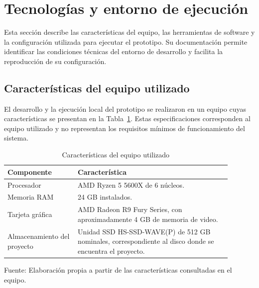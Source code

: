\section{Tecnologías y entorno de ejecución}


Esta sección describe las características del equipo,
las herramientas de software y la configuración utilizada
para ejecutar el prototipo. Su documentación permite
identificar las condiciones técnicas del entorno de
desarrollo y facilita la reproducción de su configuración.

\subsection{Características del equipo utilizado}


El desarrollo y la ejecución local del prototipo se
realizaron en un equipo cuyas características se presentan
en la Tabla~\ref{tab:hardware-prototipo}. Estas especificaciones
corresponden al equipo utilizado y no representan los
requisitos mínimos de funcionamiento del sistema.

\begin{table}[H]
    \centering
    \caption{Características del equipo utilizado}
    \label{tab:hardware-prototipo}
    \small
    \renewcommand{\arraystretch}{1.2}
    \begin{tabular}{|p{0.28\linewidth}|p{0.61\linewidth}|}
        \hline
        \textbf{Componente} & \textbf{Característica} \\
        \hline
        Procesador &
        AMD Ryzen 5 5600X de 6 núcleos. \\
        \hline
        Memoria RAM &
        24 GB instalados. \\
        \hline
        Tarjeta gráfica &
        AMD Radeon R9 Fury Series, con aproximadamente
        4 GB de memoria de video. \\
        \hline
        Almacenamiento del proyecto &
        Unidad SSD HS-SSD-WAVE(P) de 512 GB nominales,
        correspondiente al disco donde se encuentra
        el proyecto. \\
        \hline
    \end{tabular}

    \par\smallskip
    \begin{minipage}{0.95\linewidth}
        \footnotesize
        Fuente: Elaboración propia a partir de las
        características consultadas en el equipo.
    \end{minipage}
\end{table}

